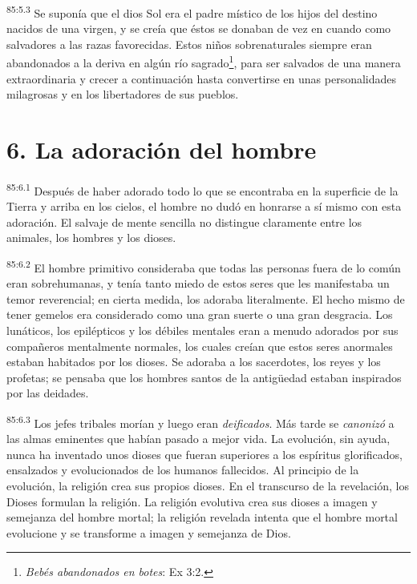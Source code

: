 \par
\textsuperscript{85:5.3} Se suponía que el dios Sol era el padre místico de los hijos del destino nacidos de una virgen, y se creía que éstos se donaban de vez en cuando como salvadores a las razas favorecidas. Estos niños sobrenaturales siempre eran abandonados a la deriva en algún río sagrado\footnote{\textit{Bebés abandonados en botes}: Ex 3:2.}, para ser salvados de una manera extraordinaria y crecer a continuación hasta convertirse en unas personalidades milagrosas y en los libertadores de sus pueblos.

\section*{6. La adoración del hombre}
\par
\textsuperscript{85:6.1} Después de haber adorado todo lo que se encontraba en la superficie de la Tierra y arriba en los cielos, el hombre no dudó en honrarse a sí mismo con esta adoración. El salvaje de mente sencilla no distingue claramente entre los animales, los hombres y los dioses.

\par
\textsuperscript{85:6.2} El hombre primitivo consideraba que todas las personas fuera de lo común eran sobrehumanas, y tenía tanto miedo de estos seres que les manifestaba un temor reverencial; en cierta medida, los adoraba literalmente. El hecho mismo de tener gemelos era considerado como una gran suerte o una gran desgracia. Los lunáticos, los epilépticos y los débiles mentales eran a menudo adorados por sus compañeros mentalmente normales, los cuales creían que estos seres anormales estaban habitados por los dioses. Se adoraba a los sacerdotes, los reyes y los profetas; se pensaba que los hombres santos de la antig\"uedad estaban inspirados por las deidades.

\par
\textsuperscript{85:6.3} Los jefes tribales morían y luego eran \textit{deificados}. Más tarde se \textit{canonizó} a las almas eminentes que habían pasado a mejor vida. La evolución, sin ayuda, nunca ha inventado unos dioses que fueran superiores a los espíritus glorificados, ensalzados y evolucionados de los humanos fallecidos. Al principio de la evolución, la religión crea sus propios dioses. En el transcurso de la revelación, los Dioses formulan la religión. La religión evolutiva crea sus dioses a imagen y semejanza del hombre mortal; la religión revelada intenta que el hombre mortal evolucione y se transforme a imagen y semejanza de Dios.

